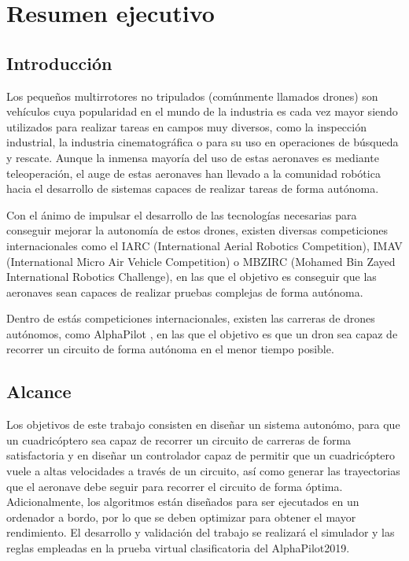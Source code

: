 \chapter*{Resumen ejecutivo}
\section*{Introducción}

Los pequeños multirrotores no tripulados (comúnmente llamados drones) son vehículos cuya popularidad en el mundo de la industria es cada vez mayor siendo utilizados para realizar tareas en campos muy diversos, como la inspección industrial, la industria cinematográfica o para su uso en operaciones de búsqueda y rescate. Aunque la inmensa mayoría del uso de estas aeronaves es mediante teleoperación, el auge de estas aeronaves han llevado a la comunidad robótica hacia el desarrollo de sistemas capaces de realizar tareas de forma autónoma.

Con el ánimo de impulsar el desarrollo de las tecnologías necesarias para conseguir mejorar la autonomía de estos drones, existen diversas competiciones internacionales como el IARC (International Aerial Robotics Competition), IMAV (International Micro Air Vehicle Competition) o MBZIRC (Mohamed Bin Zayed International Robotics Challenge), en las que el objetivo es conseguir que las aeronaves sean capaces de realizar pruebas complejas de forma autónoma. 

Dentro de estás competiciones internacionales, existen las carreras de drones autónomos, como AlphaPilot , en las que el objetivo es que un dron sea capaz de recorrer un circuito de forma autónoma en el menor tiempo posible.

\section*{Alcance}
Los objetivos de este trabajo consisten en diseñar un sistema autonómo, para que un cuadricóptero sea capaz de recorrer un circuito de carreras de forma satisfactoria y en diseñar un controlador capaz de permitir que un cuadricóptero vuele a altas velocidades a través de un circuito, así como generar las trayectorias que el aeronave debe seguir para recorrer el circuito de forma óptima. Adicionalmente, los algoritmos están diseñados para ser ejecutados en un ordenador a bordo, por lo que se deben optimizar para obtener el mayor rendimiento.
El desarrollo y validación del trabajo se realizará el simulador y las reglas empleadas en la prueba virtual clasificatoria del AlphaPilot2019.
